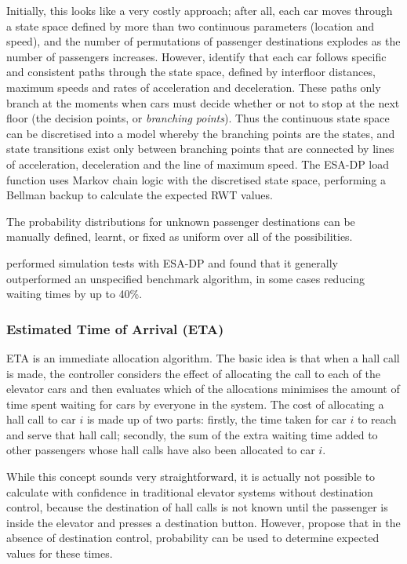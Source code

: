 \documentclass{UoYCSproject}
\begin{document}
Initially, this looks like a very costly approach; after all, each car moves through a state space defined by more than two continuous parameters (location and speed), and the number of permutations of passenger destinations explodes as the number of passengers increases.  However, \citet{Nikovski2003} identify that each car follows specific and consistent paths through the state space, defined by interfloor distances, maximum speeds and rates of acceleration and deceleration.  These paths only branch at the moments when cars must decide whether or not to stop at the next floor (the decision points, or \textit{branching points}).  Thus the continuous state space can be discretised into a model whereby the branching points are the states, and state transitions exist only between branching points that are connected by lines of acceleration, deceleration and the line of maximum speed.  The ESA-DP load function uses Markov chain logic with the discretised state space, performing a Bellman backup to calculate the expected RWT values.

The probability distributions for unknown passenger destinations can be manually defined, learnt, or fixed as uniform over all of the possibilities.

\citet{Nikovski2003} performed simulation tests with ESA-DP and found that it generally outperformed an unspecified benchmark algorithm, in some cases reducing waiting times by up to 40\%.

\subsubsection{Estimated Time of Arrival (ETA) \citep{Rong2003}}
\label{LitRevETA}

ETA is an immediate allocation algorithm.  The basic idea is that when a hall call is made, the controller considers the effect of allocating the call to each of the elevator cars and then evaluates which of the allocations minimises the amount of time spent waiting for cars by everyone in the system.  The cost of allocating a hall call to car $i$ is made up of two parts: firstly, the time taken for car $i$ to reach and serve that hall call; secondly, the sum of the extra waiting time added to other passengers whose hall calls have also been allocated to car $i$.

While this concept sounds very straightforward, it is actually not possible to calculate with confidence in traditional elevator systems without destination control, because the destination of hall calls is not known until the passenger is inside the elevator and presses a destination button.  However, \citet{Rong2003} propose that in the absence of destination control, probability can be used to determine expected values for these times.
\end{document}
